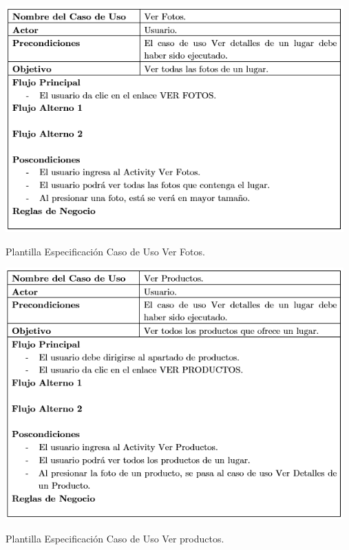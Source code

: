 \documentclass[12pt,letterpaper,openany]{book}
\begin{document}
\begin{table}[H]
\centering
\includegraphics[width=13cm]{./imagenes/PCU/ver_fotos}
\caption{Plantilla Especificación Caso de Uso Ver Fotos.}
\end{table}

\begin{table}[H]
\centering
\includegraphics[width=13cm]{./imagenes/PCU/ver_productos}
\caption{Plantilla Especificación Caso de Uso Ver productos.}
\end{table}
\end{document}
